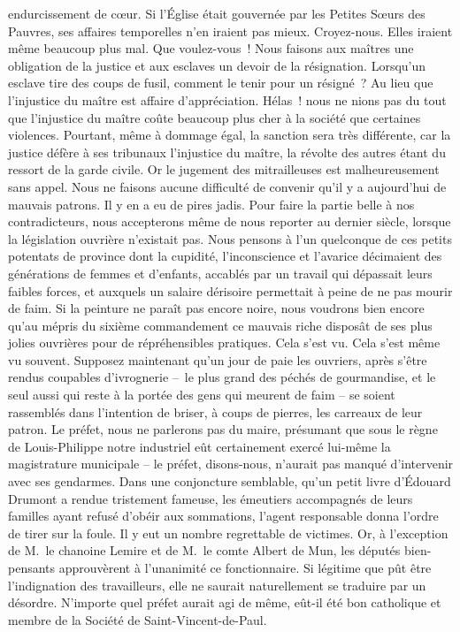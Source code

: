 \documentclass[french,twoside]{book} %
\begin{document}
endurcissement de cœur. Si l’Église était gouvernée par les Petites Sœurs des Pauvres, ses affaires temporelles n’en iraient pas mieux. Croyez-nous. Elles iraient même beaucoup plus mal. Que voulez-vous ! Nous faisons aux maîtres une obligation de la justice et aux esclaves un devoir de la résignation. Lorsqu’un esclave tire des coups de fusil, comment le tenir pour un résigné ? Au lieu que l’injustice du maître est affaire d’appréciation. Hélas ! nous ne nions pas du tout que l’injustice du maître coûte beaucoup plus cher à la société que certaines violences. Pourtant, même à dommage égal, la sanction sera très différente, car la justice défère à ses tribunaux l’injustice du maître, la révolte des autres étant du ressort de la garde civile. Or le jugement des mitrailleuses est malheureusement sans appel. Nous ne faisons aucune difficulté de convenir qu’il y a aujourd’hui de mauvais patrons. Il y en a eu de pires jadis. Pour faire la partie belle à nos contradicteurs, nous accepterons même de nous reporter au dernier siècle, lorsque la législation ouvrière n’existait pas. Nous pensons à l’un quelconque de ces petits potentats de province dont la cupidité, l’inconscience et l’avarice décimaient des générations de femmes et d’enfants, accablés par un travail qui dépassait leurs faibles forces, et auxquels un salaire dérisoire permettait à peine de ne pas mourir de faim. Si la peinture ne paraît pas encore noire, nous voudrons bien encore qu’au mépris du sixième commandement ce mauvais riche disposât de ses plus jolies ouvrières pour de répréhensibles pratiques. Cela s’est vu. Cela s’est même vu souvent. Supposez maintenant qu’un jour de paie les ouvriers, après s’être rendus coupables d’ivrognerie – le plus grand des péchés de gourmandise, et le seul aussi qui reste à la portée des gens qui meurent de faim – se soient rassemblés dans l’intention de briser, à coups de pierres, les carreaux de leur patron. Le préfet, nous ne parlerons pas du maire, présumant que sous le règne de Louis-Philippe notre industriel eût certainement exercé lui-même la magistrature municipale – le préfet, disons-nous, n’aurait pas manqué d’intervenir avec ses gendarmes. Dans une conjoncture semblable, qu’un petit livre d’Édouard Drumont a rendue tristement fameuse, les émeutiers accompagnés de leurs familles ayant refusé d’obéir aux sommations, l’agent responsable donna l’ordre de tirer sur la foule. Il y eut un nombre regrettable de victimes. Or, à l’exception de M. le chanoine Lemire et de M. le comte Albert de Mun, les députés bien-pensants approuvèrent à l’unanimité ce fonctionnaire. Si légitime que pût être l’indignation des travailleurs, elle ne saurait naturellement se traduire par un désordre. N’importe quel préfet aurait agi de même, eût-il été bon catholique et membre de la Société de Saint-Vincent-de-Paul.\par
\end{document}
